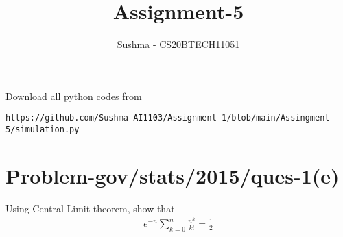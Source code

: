 \documentclass[journal,12pt,twocolumn]{IEEEtran}
\begin{document}
\let\vec\mathbf
\renewcommand{\thefigure}{\theproblem}
\def\putbox#1#2#3{\makebox[0in][l]{\makebox[#1][l]{}\raisebox{\baselineskip}[0in][0in]{\raisebox{#2}[0in][0in]{#3}}}}
     \def\rightbox#1{\makebox[0in][r]{#1}}
     \def\centbox#1{\makebox[0in]{#1}}
     \def\topbox#1{\raisebox{-\baselineskip}[0in][0in]{#1}}
     \def\midbox#1{\raisebox{-0.5\baselineskip}[0in][0in]{#1}}
\vspace{3cm}
\title{Assignment-5}
\author{Sushma - CS20BTECH11051}
\maketitle
\newpage
\bigskip
\renewcommand{\thefigure}{\theenumi}
\renewcommand{\thetable}{\theenumi}
Download all python codes from 
\begin{lstlisting}
https://github.com/Sushma-AI1103/Assignment-1/blob/main/Assingment-5/simulation.py
\end{lstlisting}

\section{Problem-gov/stats/2015/ques-1(e)}
Using Central Limit theorem, show that
\begin{align}
   e^{-n} \sum_{k=0}^{n} \frac{n^k}{k!}   = \frac{1}{2}
\end{align}
\bigskip
\end{document}
